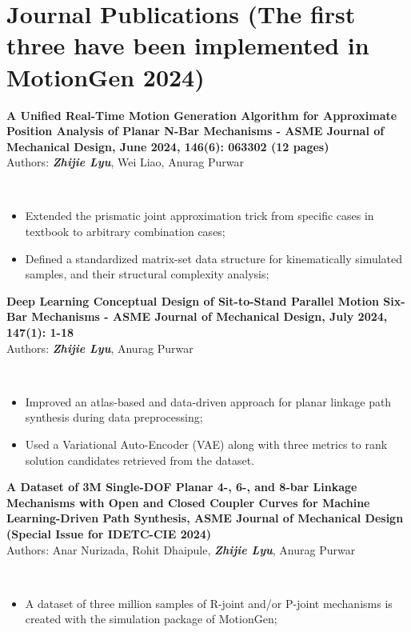 \documentclass[letterpaper,12pt]{article}
\begin{document}
\section{Journal Publications (The first three have been implemented in MotionGen 2024)}
 \begin{itemize}[leftmargin=0.15in, label={}]
    \item{
    \textbf{A Unified Real-Time Motion Generation Algorithm for Approximate Position Analysis of Planar N-Bar Mechanisms - ASME Journal of Mechanical Design, June 2024, 146(6): 063302 (12 pages)}{\\ Authors: \textbf{ \emph{Zhijie Lyu}}, Wei Liao, Anurag Purwar}
    {\\ \small{\begin{itemize}
        \item Extended the prismatic joint approximation trick from specific cases in textbook to arbitrary combination cases; 
        \item Defined a standardized matrix-set data structure for kinematically simulated samples, and their structural complexity analysis; 
    \end{itemize} 
    }}
    }
    \item{\textbf{Deep Learning Conceptual Design of Sit-to-Stand Parallel Motion Six-Bar Mechanisms - ASME Journal of Mechanical Design, July 2024, 147(1): 1-18}{\\ Authors: \textbf{\emph{Zhijie Lyu}}, Anurag Purwar}
    {\\ \small{\begin{itemize}
        \item Improved an atlas-based and data-driven approach for planar linkage path synthesis during data preprocessing; 
        \item Used a Variational Auto-Encoder (VAE) along with three metrics to rank solution candidates retrieved from the dataset. 
    \end{itemize}}}
    \item{\textbf{A Dataset of 3M Single-DOF Planar 4-, 6-, and 8-bar Linkage Mechanisms with Open and Closed Coupler Curves for Machine Learning-Driven Path Synthesis, ASME Journal of Mechanical Design (Special Issue for IDETC-CIE 2024)}{\\ Authors: Anar Nurizada, Rohit Dhaipule, \emph{\textbf{Zhijie Lyu}}, Anurag Purwar}
        {\\ \small{\begin{itemize}
        \item A dataset of three million samples of R-joint and/or P-joint mechanisms is created with the simulation package of MotionGen; 

\end{itemize}}}}}
\end{itemize}
\end{document}
